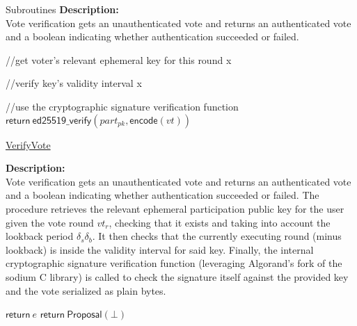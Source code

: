 \documentclass[10pt,a4paper]{article}
\begin{document}
\begin{section}{Subroutines}
\noindent \textbf{Description:}\\
Vote verification gets an unauthenticated vote and returns an authenticated vote and a
boolean indicating whether authentication succeeded or failed.


\begin{algorithm}[H]\label{algo:verify-part-sign}
    \begin{algorithmic}[1]
        
        //get voter's relevant ephemeral key for this round
        \State x

        //verify key's validity interval
        \State x

        //use the cryptographic signature verification function
        \State $\mathsf{return} \ \mathsf{ed25519\_verify}(part_{pk}, \mathsf{encode}(vt))$
    \EndFunction
    \end{algorithmic}
    \caption{\underline{VerifyVote}}
\end{algorithm}

\noindent \textbf{Description:}\\
Vote verification gets an unauthenticated vote and returns an authenticated vote and a
boolean indicating whether authentication succeeded or failed.
The procedure retrieves the relevant ephemeral participation public key for the user given the vote round $vt_r$,
checking that it exists and taking into account the lookback period $\delta_s\delta_b$.
It then checks that the currently executing round (minus lookback) is inside the validity interval for said key.
Finally, the internal cryptographic signature verification function (leveraging Algorand's fork of the sodium C library)
is called to check the signature itself against the provided key and the vote serialized as plain bytes.


\begin{algorithm}[H]
    \begin{algorithmic}[1]

        \State $\mathsf{return} \ e $
    \Else
        \State $\mathsf{return} \ \mathsf{Proposal}(\bot) $
    \EndIf


\end{algorithmic}
\end{algorithm}
\end{section}
\end{document}
